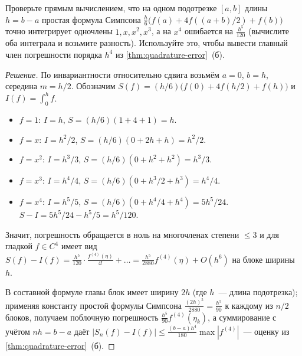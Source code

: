 \begin{problem}
\label{prob:simpson-precision}
Проверьте прямым вычислением, что на одном подотрезке $[a, b]$ длины
$h = b - a$ простая формула Симпсона
$\tfrac{h}{6}\bigl(f(a) + 4 f((a + b)/2) + f(b)\bigr)$ точно
интегрирует одночлены $1, x, x^2, x^3$, а на $x^4$ ошибается на
$\tfrac{h^5}{120}$ (вычислите оба интеграла и возьмите разность).
Используйте это, чтобы вывести главный член погрешности порядка
$h^4$ из \cref{thm:quadrature-error}~(б).
\end{problem}

\begin{proof}[Решение]
По инвариантности относительно сдвига возьмём $a = 0$, $b = h$,
середина $m = h/2$. Обозначим $S(f) = (h/6)\bigl(f(0) + 4 f(h/2) + f(h)\bigr)$
и $I(f) = \int_0^h f$.
\begin{itemize}
  \item $f = 1$: $I = h$, $S = (h/6)(1 + 4 + 1) = h$.
  \item $f = x$: $I = h^2/2$, $S = (h/6)(0 + 2 h + h) = h^2/2$.
  \item $f = x^2$: $I = h^3/3$, $S = (h/6)(0 + h^2 + h^2) = h^3/3$.
  \item $f = x^3$: $I = h^4/4$, $S = (h/6)(0 + h^3/2 + h^3) = h^4/4$.
  \item $f = x^4$: $I = h^5/5$, $S = (h/6)(0 + h^4/4 + h^4) = 5 h^5/24$.
        $S - I = 5 h^5/24 - h^5/5 = h^5/120$.
\end{itemize}
Значит, погрешность обращается в ноль на многочленах степени $\le 3$
и для гладкой $f \in C^4$ имеет вид
$S(f) - I(f) = \tfrac{h^5}{120} \cdot \tfrac{f^{(4)}(\eta)}{4!} + \dots
= \tfrac{h^5}{2880} f^{(4)}(\eta) + O(h^6)$ на блоке ширины~$h$.

В составной формуле главы блок имеет ширину $2 h$ (где $h$~--- длина
подотрезка); применяя константу простой формулы Симпсона
$\tfrac{(2h)^5}{2880} = \tfrac{h^5}{90}$ к каждому из $n / 2$ блоков,
получаем поблочную погрешность $\tfrac{h^5}{90} f^{(4)}(\eta_k)$, а
суммирование с учётом $n h = b - a$ даёт
$|S_n(f) - I(f)| \le \tfrac{(b - a) h^4}{180} \max |f^{(4)}|$~---
оценку из \cref{thm:quadrature-error}~(б).
\end{proof}
